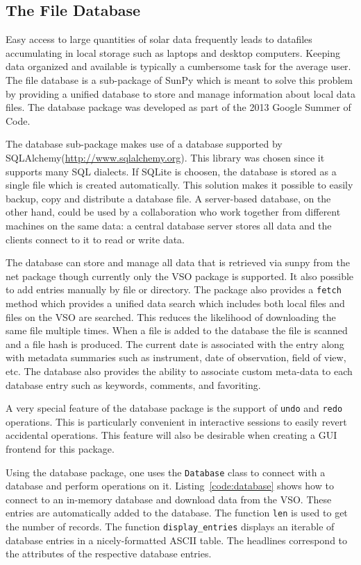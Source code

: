 \subsection{The File Database}
Easy access to large quantities of solar data frequently leads to datafiles accumulating
in local storage such as laptops and desktop computers. Keeping data organized and available
is typically a cumbersome task for the average user. The file database is a sub-package of 
SunPy which is meant to solve this problem by providing a unified database to store and manage information about 
local data files. The database package was developed as part of the 2013 
Google Summer of Code. 

The database sub-package makes use of a database supported by
SQLAlchemy(\url{http://www.sqlalchemy.org}). This library was chosen
since it supports many SQL dialects. If SQLite is choosen, the database is stored as a single file which is
created automatically. This solution makes it possible to easily backup, copy and distribute
a database file. A server-based database, on the other hand, could be used by a collaboration 
who work together from different machines on the
same data: a central database server stores all data and the clients connect to
it to read or write data.

The database can store and manage all data that is retrieved via sunpy from the net
package though currently only the \textsc{VSO} package is supported. 
It also possible to add entries manually by file or directory. The package also provides
a \texttt{fetch} method which provides a unified data search which includes both local files
and files on the \textsc{VSO} are searched. This reduces the likelihood of downloading the same file 
multiple times. When a file is added to the database the file is scanned and a file hash is produced. 
The current date is associated with the entry along with metadata summaries such 
as instrument, date of observation, field of view, etc. 
The database also provides the ability to associate custom meta-data to 
each database entry such as keywords, comments, and favoriting.

A very special feature of the database package is the support of \texttt{undo}
and \texttt{redo} operations. This is particularly convenient in
interactive sessions to easily revert accidental operations. 
This feature will also be desirable when creating a GUI frontend for this package.

Using the database package, one uses the \texttt{Database} class to connect
with a database and perform operations on it. Listing~\ref{code:database} shows how to connect
to an in-memory database and download data from the \textsc{VSO}. These entries are
automatically added to the database. The function \texttt{len} is used to get the number of
records. The function \texttt{display\_entries} displays an iterable of database entries
in a nicely-formatted \textsc{ASCII} table. The headlines correspond to the
attributes of the respective database entries.

